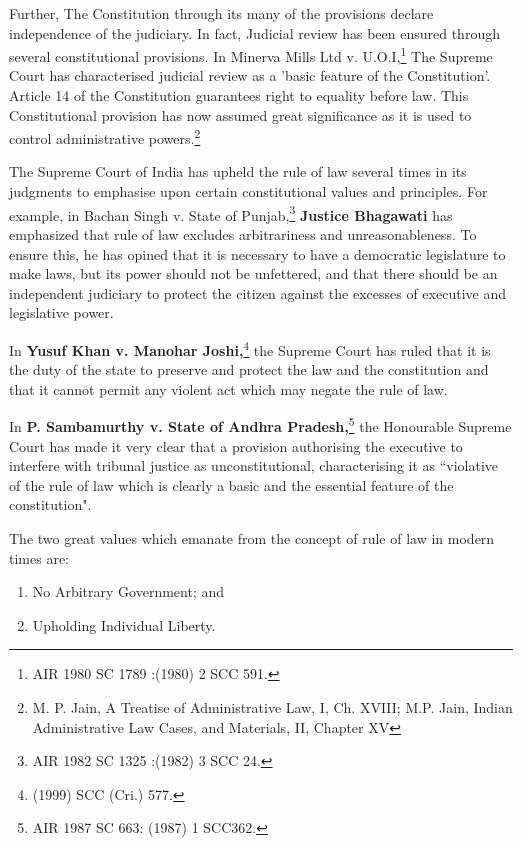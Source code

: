 \begin{multicols}{2}
\noi
Further, The Constitution through its many of the provisions declare independence of the
judiciary. In fact, Judicial review has been ensured through several constitutional provisions. In Minerva Mills Ltd v. U.O.I,\footnote{AIR 1980 SC 1789 :(1980) 2 SCC 591.}  The Supreme Court has characterised judicial review as a 'basic feature of the Constitution'. Article 14 of the Constitution guarantees right to equality before law. This Constitutional provision has now assumed great significance as it is used to control administrative powers.\footnote{M. P. Jain, A Treatise of Administrative Law, I, Ch. XVIII; M.P. Jain, Indian Administrative Law Cases, and Materials, II, Chapter XV}

\noi
The Supreme Court of India has upheld the rule of law several times in its judgments to emphasise
upon certain constitutional values and principles. For example, in Bachan Singh v. State of
Punjab,\footnote{AIR 1982 SC 1325 :(1982) 3 SCC 24.} \textbf{Justice Bhagawati} has emphasized that rule of law excludes arbitrariness and unreasonableness. To ensure this, he has opined that it is necessary to have a democratic legislature to make laws, but its power should not be unfettered, and that there should be an independent judiciary to protect the citizen against the excesses of executive and legislative power.

\noi
In \textbf{Yusuf Khan v. Manohar Joshi,}\footnote{(1999) SCC (Cri.) 577.} the Supreme Court has ruled that it is the duty of the state to preserve and protect the law and the constitution and that it cannot permit any violent act which may negate the rule of law.

\noi
In \textbf{P. Sambamurthy v. State of Andhra Pradesh,}\footnote{AIR 1987 SC 663: (1987) 1 SCC362.} the Honourable Supreme Court has made it very clear that a provision authorising the executive to interfere with tribunal justice as
unconstitutional, characterising it as “violative of the rule of law which is clearly a basic and the
essential feature of the constitution".

\noi
The two great values which emanate from the concept of rule of law in modern times are:

\begin{enumerate}
\item No Arbitrary Government; and

\item Upholding Individual Liberty.
\end{enumerate}


\end{multicols}
